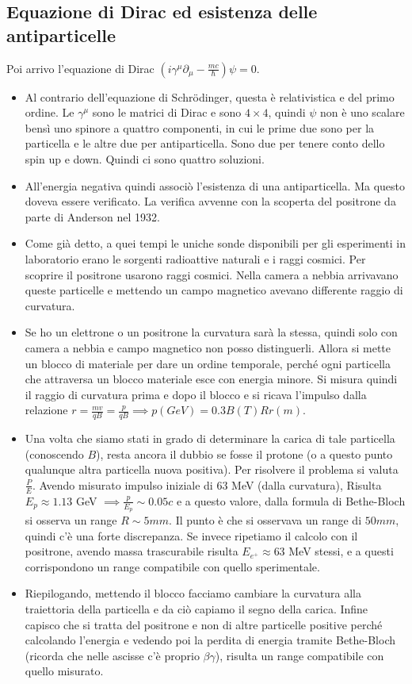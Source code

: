 \subsection{Equazione di Dirac ed esistenza delle antiparticelle}
Poi arrivo l'equazione di Dirac $(i\gamma^\mu\partial_\mu-\frac{mc}{\hbar})\psi=0$.
\begin{itemize}
    \item Al contrario dell'equazione di Schrödinger, questa è relativistica e del primo ordine. Le $\gamma^\mu$ sono le matrici di Dirac e sono $4\times 4$, quindi $\psi$ non è uno scalare bensì uno spinore a quattro componenti, in cui le prime due sono per la particella e le altre due per antiparticella. Sono due per tenere conto dello spin up e down. Quindi ci sono quattro soluzioni.
    \item All'energia negativa quindi associò l'esistenza di una antiparticella. Ma questo doveva essere verificato. La verifica avvenne con la scoperta del positrone da parte di Anderson nel 1932.
    \item Come già detto, a quei tempi le uniche sonde disponibili per gli esperimenti in laboratorio erano le sorgenti radioattive naturali e i raggi cosmici. Per scoprire il positrone usarono raggi cosmici. Nella camera a nebbia arrivavano queste particelle e mettendo un campo magnetico avevano differente raggio di curvatura. 
    \item Se ho un elettrone o un positrone la curvatura sarà la stessa, quindi solo con camera a nebbia e campo magnetico non posso distinguerli. Allora si mette un blocco di materiale per dare un ordine temporale, perché ogni particella che attraversa un blocco materiale esce con energia minore. Si misura quindi il raggio di curvatura prima e dopo il blocco e si ricava l'impulso dalla relazione $r=\frac{mv}{qB}=\frac{p}{qB}\implies p(GeV)=0.3 B(T)Rr(m)$. 
    \item Una volta che siamo stati in grado di determinare la carica di tale particella (conoscendo $B$), resta ancora il dubbio se fosse il protone (o a questo punto qualunque altra particella nuova positiva). Per risolvere il problema si valuta $\frac P E$. Avendo misurato impulso iniziale di $63$ MeV (dalla curvatura), Risulta $E_p\approx 1.13$ GeV $\implies \frac p {E_p} \sim 0.05c$ e a questo valore, dalla formula di Bethe-Bloch si osserva un range $R\sim5mm$. Il punto è che si osservava un range di $50mm$, quindi c'è una forte discrepanza. Se invece ripetiamo il calcolo con il positrone, avendo massa trascurabile risulta $E_{e^+}\approx 63$ MeV stessi, e a questi corrispondono un range compatibile con quello sperimentale.
    \item Riepilogando, mettendo il blocco facciamo cambiare la curvatura alla traiettoria della particella e da ciò capiamo il segno della carica. Infine capisco che si tratta del positrone e non di altre particelle positive perché calcolando l'energia e vedendo poi la perdita di energia tramite Bethe-Bloch (ricorda che nelle ascisse c'è proprio $\beta\gamma$), risulta un range compatibile con quello misurato. 
\end{itemize}
